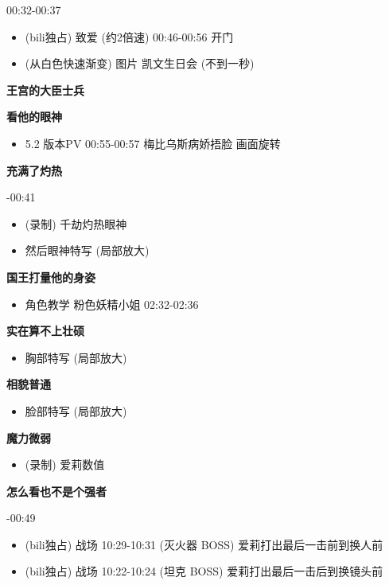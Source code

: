 \documentclass[a4paper]{article}
\begin{document}
00:32-00:37

\begin{itemize}
    \item (bili独占) 致爱 (约2倍速) 00:46-00:56 开门
    \item (从白色快速渐变) 图片 凯文生日会 (不到一秒)
\end{itemize}

\textbf{王宫的大臣士兵}

\textbf{看他的眼神}

\begin{itemize}
    \item 5.2 版本PV 00:55-00:57 梅比乌斯病娇捂脸 画面旋转
\end{itemize}

\textbf{充满了灼热}

-00:41
 
\begin{itemize}
    \item (录制) 千劫灼热眼神
    \item 然后眼神特写 (局部放大)
\end{itemize}

\textbf{国王打量他的身姿}

\begin{itemize}
    \item 角色教学 粉色妖精小姐 02:32-02:36
\end{itemize}

\textbf{实在算不上壮硕}

\begin{itemize}
    \item 胸部特写 (局部放大)
\end{itemize}

\textbf{相貌普通}

\begin{itemize}
    \item 脸部特写 (局部放大)
\end{itemize}

\textbf{魔力微弱}

\begin{itemize}
    \item (录制) 爱莉数值
\end{itemize}

\textbf{怎么看也不是个强者}

-00:49

\begin{itemize}
    \item (bili独占) 战场 10:29-10:31 (灭火器 BOSS) 爱莉打出最后一击前到换人前
    \item (bili独占) 战场 10:22-10:24 (坦克 BOSS) 爱莉打出最后一击后到换镜头前
\end{itemize}
\end{document}

